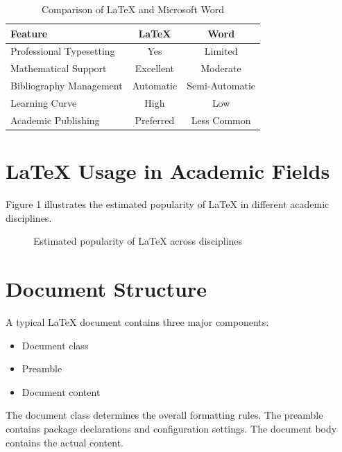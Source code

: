 \documentclass{academic-template}
\begin{document}
\begin{table}[h]
\centering
\caption{Comparison of LaTeX and Microsoft Word}
\begin{tabular}{|l|c|c|}
\hline
Feature & LaTeX & Word \\
\hline
Professional Typesetting & Yes & Limited \\
Mathematical Support & Excellent & Moderate \\
Bibliography Management & Automatic & Semi-Automatic \\
Learning Curve & High & Low \\
Academic Publishing & Preferred & Less Common \\
\hline
\end{tabular}
\end{table}

\section{LaTeX Usage in Academic Fields}

Figure 1 illustrates the estimated popularity of LaTeX in different academic disciplines.

\begin{figure}[h]
\centering
{}
\caption{Estimated popularity of LaTeX across disciplines}
\end{figure}

\section{Document Structure}

A typical LaTeX document contains three major components:

\begin{itemize}
\item Document class
\item Preamble
\item Document content
\end{itemize}

The document class determines the overall formatting rules. The preamble contains package declarations and configuration settings. The document body contains the actual content.
\end{document}
